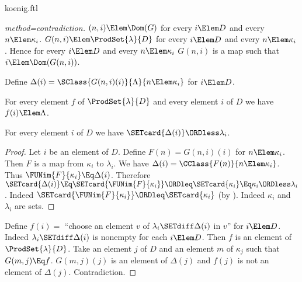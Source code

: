 \documentclass{stex}
\begin{document}
\begin{smodule}{koenig.ftl}
\begin{forthel}
\begin{proof}[method=contradiction]
    $(n,i) \Elem \Dom(G)$ for every $i \Elem D$ and every $n \Elem \kappa_{i}$.
    $G(n,i) \Elem \ProdSet{\lambda}{D}$ for every $i \Elem D$ and every $n \Elem \kappa_{i}$.
    Hence for every $i \Elem D$ and every $n \Elem \kappa_{i}$ $G(n,i)$ is a map such that $i \Elem \Dom(G(n,i))$.

    Define $\Delta(i) = \SClass{G(n,i)(i)}{\Lambda}{n \Elem \kappa_{i}}$ for $i \Elem D$.

    For every element $f$ of $\ProdSet{\lambda}{D}$ and every element $i$ of $D$ we have $f(i) \Elem \Lambda$.

    For every element $i$ of $D$ we have $\SETcard{\Delta(i)} \ORDless \lambda_{i}$.
    \begin{proof}
      Let $i$ be an element of $D$.
      Define $F(n) = G(n,i)(i)$ for $n \Elem \kappa_{i}$.
      Then $F$ is a map from $\kappa_{i}$ to $\lambda_{i}$.
      We have $\Delta(i) = \CClass{F(n)}{n \Elem \kappa_{i}}$.
      Thus $\FUNim{F}{\kappa_{i}} \Eq \Delta(i)$.
      Therefore $\SETcard{\Delta(i)}
        \Eq \SETcard{\FUNim{F}{\kappa_{i}}}
        \ORDleq \SETcard{\kappa_{i}}
        \Eq \kappa_{i}
        \ORDless \lambda_{i}$.
      Indeed $\SETcard{\FUNim{F}{\kappa_{i}}} \ORDleq \SETcard{\kappa_{i}}$ (by ).
      Indeed $\kappa_{i}$ and $\lambda_{i}$ are sets.
    \end{proof}

    Define $f(i) =$ ``choose an element $v$ of $\lambda_{i} \SETdiff \Delta(i)$ in $v$'' for $i \Elem D$.
    Indeed $\lambda_{i} \SETdiff \Delta(i)$ is nonempty for each $i \Elem D$.
    Then $f$ is an element of $\ProdSet{\lambda}{D}$.
    Take an element $j$ of $D$ and an element $m$ of $\kappa_{j}$ such that $G(m,j) \Eq f$.
    $G(m,j)(j)$ is an element of $\Delta(j)$ and $f(j)$ is not an element of $\Delta(j)$.
    Contradiction.
  \end{proof}
\end{forthel}

\printbibliography
{}
\end{smodule}
\end{document}
